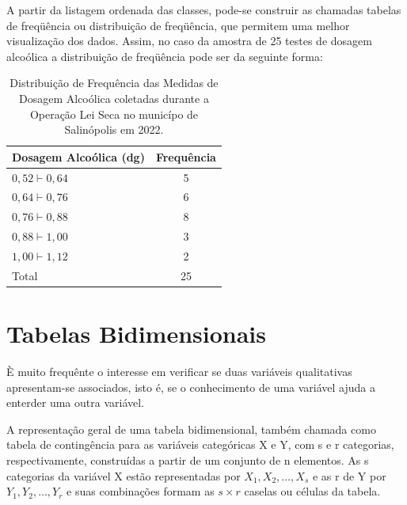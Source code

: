 \newpage

A partir da listagem ordenada das classes, pode-se construir
as chamadas tabelas de freqüência ou distribuição
de freqüência, que permitem uma melhor visualização dos dados.
Assim, no caso da amostra de 25 testes de dosagem alcoólica 
a distribuição de freqüência pode ser da seguinte forma:


\begin{table}[!htb]
    \centering
    {
    \caption{Distribuição de Frequência das Medidas de Dosagem Alcoólica coletadas durante a Operação Lei Seca no municípo de Salinópolis em 2022.}
    \label{toxalimentar}
    \vspace{-0.1cm}
\begin{tabular}{l|c}
  \hline\hline
  Dosagem Alcoólica (dg) & Frequência \\
  \hline\hline
  $0,52 \vdash 0,64$ & 5 \\
  $0,64 \vdash 0,76$ & 6 \\
  $0,76 \vdash 0,88$ & 8 \\
  $0,88 \vdash 1,00$ & 3 \\
  $1,00 \vdash 1,12$ & 2 \\
  \hline\hline
  Total & 25 \\
    \hline\hline
\end{tabular}}
\end{table}

\newpage

\section{Tabelas Bidimensionais}

È muito frequênte o interesse em verificar se duas variáveis
qualitativas apresentam-se associados, isto é, se o conhecimento de uma
variável ajuda a enterder uma outra variável.\vskip0.3cm


A representação geral de uma tabela bidimensional, também chamada como tabela de contingência
para as variáveis categóricas X e Y, com s e r categorias, respectivamente, construídas a partir de um conjunto de n elementos. As s categorias da variável X estão representadas por $X_{1},X_{2},\ldots,X_{s}$ e as r de Y por $Y_{1},Y_{2},\ldots,Y_{r}$ e suas combinações formam as $s \times r$ caselas ou células da tabela.


